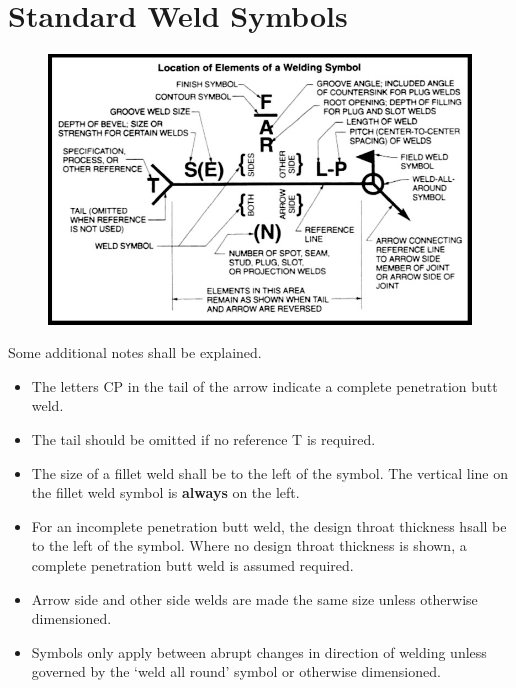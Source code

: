 \section{Standard Weld Symbols}
\begin{figure}[H]
\centering
\includegraphics[scale=.7]{PIC/CH07/WS}
\end{figure}
Some additional notes shall be explained.
\begin{itemize}
\item The letters CP in the tail of the arrow indicate a complete penetration butt weld.
\item The tail should be omitted if no reference T is required.
\item The size of a fillet weld shall be to the left of the symbol. The vertical line on the fillet weld symbol is \textbf{always} on the left.
\item For an incomplete penetration butt weld, the design throat thickness hsall be to the left of the symbol. Where no design throat thickness is shown, a complete penetration butt weld is assumed required.
\item Arrow side and other side welds are made the same size unless otherwise dimensioned.
\item Symbols only apply between abrupt changes in direction of welding unless governed by the `weld all round' symbol or otherwise dimensioned.
\end{itemize}

